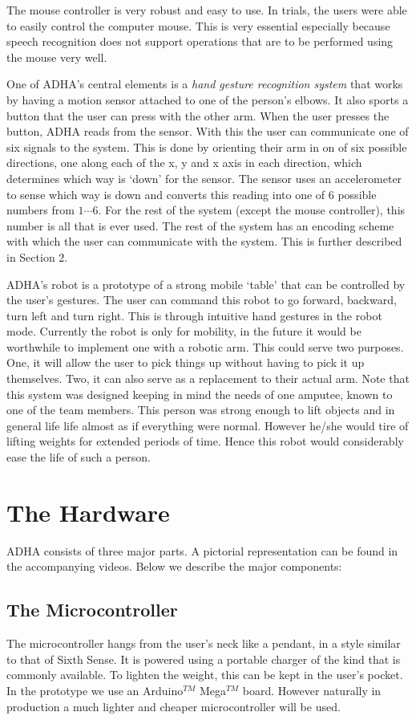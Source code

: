 \documentclass[12pt]{article}
\begin{document}
The mouse controller is very robust and easy to use. In trials, the users were able to easily control the computer mouse. This is very essential especially because speech recognition does not support operations that are to be performed using the mouse very well.

One of ADHA's central elements is a \textit{hand gesture recognition system} that works by having a motion sensor attached to one of the person's elbows. It also sports a button that the user can press with the other arm. When the user presses the button, ADHA reads from the sensor. With this the user can communicate one of six signals to the system. This is done by orienting their arm in on of six possible directions, one along each of the x, y and x axis in each direction, which determines which way is `down' for the sensor. The sensor uses an accelerometer to sense which way is down and converts this reading into one of 6 possible numbers from $1\cdots6$. For the rest of the system (except the mouse controller), this number is all that is ever used. The rest of the system has an encoding scheme with which the user can communicate with the system. This is further described in Section 2.

ADHA's robot is a prototype of a strong mobile `table' that can be controlled by the user's gestures. The user can command this robot to go forward, backward, turn left and turn right. This is through intuitive hand gestures in the robot mode. Currently the robot is only for mobility, in the future it would be worthwhile to implement one with a robotic arm. This could serve two purposes. One, it will allow the user to pick things up without having to pick it up themselves. Two, it can also serve as a replacement to their actual arm. Note that this system was designed keeping in mind the needs of one amputee, known to one of the team members. This person was strong enough to lift objects and in general life life almost as if everything were normal. However he/she would tire of lifting weights for extended periods of time. Hence this robot would considerably ease the life of such a person.

\section{The Hardware}
ADHA consists of three major parts. A pictorial representation can be found in the accompanying videos. Below we describe the major components:
\subsection{The Microcontroller}
The microcontroller hangs from the user's neck like a pendant, in a style similar to that of Sixth Sense. It is powered using a portable charger of the kind that is commonly available. To lighten the weight, this can be kept in the user's pocket. In the prototype we use an Arduino$^{TM}$ Mega$^{TM}$ board. However naturally in production a much lighter and cheaper microcontroller will be used.
\end{document}
